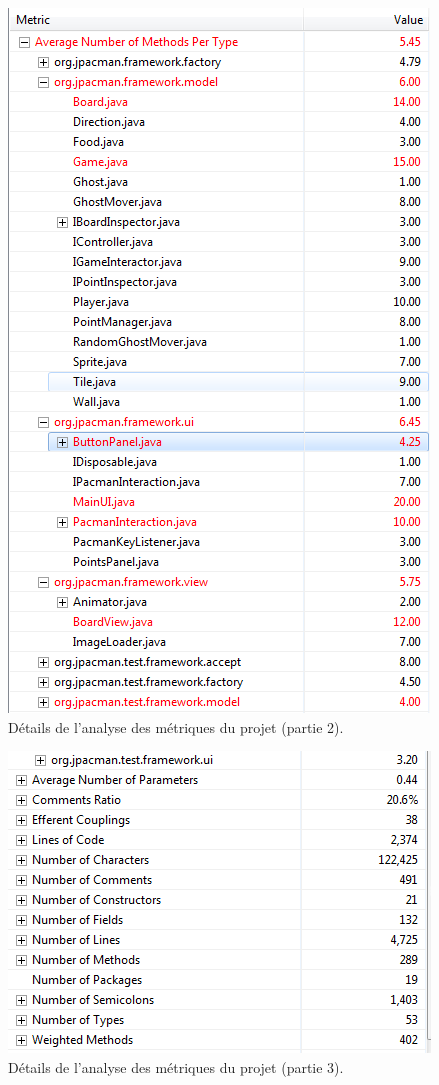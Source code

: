 \documentclass[12pt,a4paper,final]{article}
\begin{document}
\begin{figure}[!h]
	\centering
	\includegraphics[height=\textheight]{Metrique4.png}
	\caption{\label{métrique4}Détails de l'analyse des métriques du projet (partie 2).}
\end{figure}
\begin{figure}[!h]
	\centering
	\includegraphics[width=\textwidth]{Metrique5.png}
	\caption{\label{métrique5}Détails de l'analyse des métriques du projet (partie 3).}
\end{figure}
\end{document}
